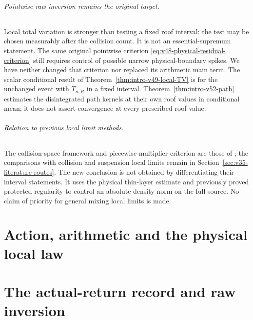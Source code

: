 \documentclass[11pt,reqno]{amsart}
\numberwithin{equation}{section}
\theoremstyle{definition}\newtheorem{definition}[theorem]{Definition}
\theoremstyle{remark}\newtheorem{remark}[theorem]{Remark}
\begin{document}
\paragraph{Pointwise raw inversion remains the original target.}
Local total variation is stronger than testing a fixed roof interval:
the test may be chosen measurably after the collision count. It is not
an essential-supremum statement. The same original pointwise criterion
\eqref{eq:v48-physical-residual-criterion} still requires control of
possible narrow physical-boundary spikes. We have neither changed that
criterion nor replaced its arithmetic main term. The scalar conditional result of Theorem~\ref{thm:intro-v49-local-TV}
is for the unchanged event with $T_{n,R}$ in a fixed interval.
Theorem~\ref{thm:intro-v52-path} estimates the disintegrated path
kernels at their own roof values in conditional mean; it does not
assert convergence at every prescribed roof value.

\paragraph{Relation to previous local limit methods.}
The collision-space framework and piecewise multiplier criterion are
those of \cite{DZ11,DZ,DPZ}; the comparisons with collision and
suspension local limits remain in
Section~\ref{sec:v35-literature-routes}. The new conclusion is not
obtained by differentiating their interval statements. It uses the
physical thin-layer estimate and previously proved protected
regularity to control an absolute density norm on the full source.
No claim of priority for general mixing local limits is made.

\part{Action, arithmetic and the physical local law}









\part{The actual-return record and raw inversion}
\end{document}
